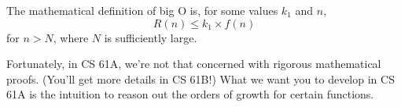 The mathematical definition of big O is, for some values $k_1$ and $n$,
\begin{equation}
 R(n) \leq k_1 \times f(n)
\end{equation}
for $n > N$, where $N$ is sufficiently large.

Fortunately, in CS 61A, we're not that concerned with rigorous mathematical
proofs. (You'll get more details in CS 61B!) What we want you to develop in CS
61A is the intuition to reason out the orders of growth for certain functions.
